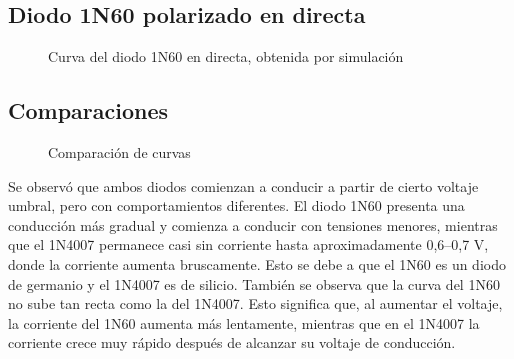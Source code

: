 \subsection{Diodo 1N60 polarizado en directa}
\begin{figure}[H]
\centering
{}
\caption{Curva del diodo 1N60 en directa, obtenida por simulación}
\end{figure}

\subsection{Comparaciones}
\begin{figure}[H]
\centering
{}
\caption{Comparación de curvas }
\end{figure}

Se observó que ambos diodos comienzan a conducir a partir de cierto voltaje umbral, pero con comportamientos diferentes. El diodo 1N60 presenta una conducción más gradual y comienza a conducir con tensiones menores, mientras que el 1N4007 permanece casi sin 
corriente hasta aproximadamente 0,6–0,7 V, donde la corriente aumenta bruscamente. Esto se debe a que el 1N60 es un diodo de germanio y el 1N4007 es de silicio.
También se observa que la curva del 1N60 no sube tan recta como la del 1N4007. Esto significa que, al aumentar el voltaje, la corriente del 1N60 aumenta más lentamente, mientras que en el 1N4007 la corriente crece muy rápido después de alcanzar su voltaje de conducción.

